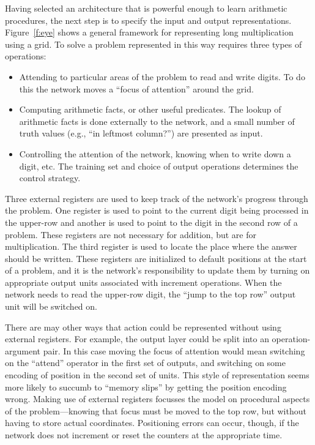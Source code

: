 Having selected an architecture that is powerful enough to learn arithmetic
procedures, the next step is to specify the input and output
representations.
Figure~\ref{f:eye} shows a general framework for
representing long multiplication using a grid.
To solve a problem
represented in this way requires three types of operations:
\begin{itemize}

\item Attending to particular areas of the problem to
read and write digits.  To do this the network moves a ``focus of
attention'' around the grid.

\item Computing arithmetic facts, or other useful predicates.  The
lookup of arithmetic facts is done externally to the network, and a small
number of truth values (e.g., ``in leftmost column?'') are presented as
input.

\item Controlling the attention of the network, knowing when to write
down a digit, etc.  The training set and choice of output operations
determines the control strategy.

\end{itemize}


Three external registers are used to keep track of the network's progress
through the problem.  One register is used to point to the current digit
being processed in the upper-row and another is used to point to
the digit in the second row of a problem.  These registers are not
necessary for addition, but are for multiplication.
The third register is used to locate the place
where
the answer should be written.  These registers are initialized to default
positions at the start of a problem, and it is the network's responsibility
to update them by turning on appropriate output units
associated with increment operations. When the network needs
to read the upper-row digit, the ``jump to the top row'' output unit will
be switched on.

There are may other ways that action could be represented without using
external registers. For example, the output layer could be split into an
operation-argument pair.  In this case moving the focus of attention would
mean switching on the ``attend'' operator in the first set of outputs, and
switching on some encoding of position in the second set of units. This
style of representation seems more likely to succumb to ``memory slips''
by getting the position encoding wrong. Making use of external registers
focusses the
model on procedural aspects of the problem---knowing
that focus must be moved to the top row, but without having to store actual
coordinates.
Positioning errors can occur, though, if the network does not increment or
reset the counters at the appropriate time.

